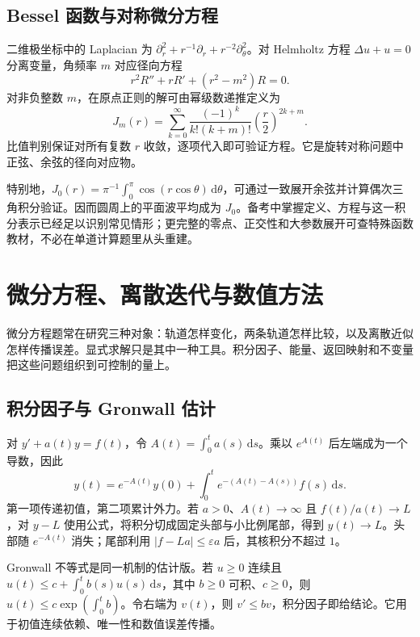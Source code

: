\documentclass[12pt,fontset=fandol]{ctexart}
\begin{document}
\subsection{Bessel 函数与对称微分方程}

\label{app:special-bessel}

二维极坐标中的 Laplacian 为 $\partial_r^2+r^{-1}\partial_r+r^{-2}\partial_\theta^2$。对 Helmholtz 方程 $\Delta u+u=0$ 分离变量，角频率 $m$ 对应径向方程
\[
r^2R''+rR'+(r^2-m^2)R=0.
\]
对非负整数 $m$，在原点正则的解可由幂级数递推定义为
\[
J_m(r)=\sum_{k=0}^\infty\frac{(-1)^k}{k!(k+m)!}\left(\frac r2\right)^{2k+m}.
\]
比值判别保证对所有复数 $r$ 收敛，逐项代入即可验证方程。它是旋转对称问题中正弦、余弦的径向对应物。

特别地，$J_0(r)=\pi^{-1}\int_0^\pi\cos(r\cos\theta)\,\mathrm d\theta$，可通过一致展开余弦并计算偶次三角积分验证。因而圆周上的平面波平均成为 $J_0$。备考中掌握定义、方程与这一积分表示已经足以识别常见情形；更完整的零点、正交性和大参数展开可查特殊函数教材，不必在单道计算题里从头重建。



\section{微分方程、离散迭代与数值方法}

微分方程题常在研究三种对象：轨道怎样变化，两条轨道怎样比较，以及离散近似怎样传播误差。显式求解只是其中一种工具。积分因子、能量、返回映射和不变量把这些问题组织到可控制的量上。

\subsection{积分因子与 Gronwall 估计}

\label{app:dynamics-factor}

对 $y'+a(t)y=f(t)$，令 $A(t)=\int_0^ta(s)\,\mathrm ds$。乘以 $e^{A(t)}$ 后左端成为一个导数，因此
\[
y(t)=e^{-A(t)}y(0)+\int_0^te^{-(A(t)-A(s))}f(s)\,\mathrm ds.
\]
第一项传递初值，第二项累计外力。若 $a>0$、$A(t)\to\infty$ 且 $f(t)/a(t)\to L$，对 $y-L$ 使用公式，将积分切成固定头部与小比例尾部，得到 $y(t)\to L$。头部随 $e^{-A(t)}$ 消失；尾部利用 $|f-La|\leq\varepsilon a$ 后，其核积分不超过 $1$。

Gronwall 不等式是同一机制的估计版。若 $u\geq0$ 连续且 $u(t)\leq c+\int_0^tb(s)u(s)\,\mathrm ds$，其中 $b\geq0$ 可积、$c\geq0$，则 $u(t)\leq c\exp(\int_0^tb)$。令右端为 $v(t)$，则 $v'\leq bv$，积分因子即给结论。它用于初值连续依赖、唯一性和数值误差传播。
\end{document}
